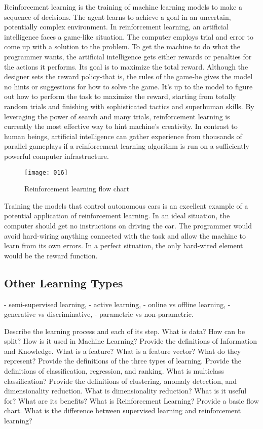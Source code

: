Reinforcement learning is the training of machine learning models to make a sequence of decisions. The agent learns to achieve a goal in an uncertain, potentially complex environment. In reinforcement learning, an artificial intelligence faces a game-like situation. The computer employs trial and error to come up with a solution to the problem. To get the machine to do what the programmer wants, the artificial intelligence gets either rewards or penalties for the actions it performs. Its goal is to maximize the total reward.
Although the designer sets the reward policy-that is, the rules of the game-he gives the model no hints or suggestions for how to solve the game. It's up to the model to figure out how to perform the task to maximize the reward, starting from totally random trials and finishing with sophisticated tactics and superhuman skills. By leveraging the power of search and many trials, reinforcement learning is currently the most effective way to hint machine's creativity. In contrast to human beings, artificial intelligence can gather experience from thousands of parallel gameplays if a reinforcement learning algorithm is run on a sufficiently powerful computer infrastructure.
\begin{figure}[t!]
    \begin{center}
        \texttt{[image: 016]}
    \end{center}
    \caption{Reinforcement learning flow chart}
    \label{fig:016}
\end{figure}

Training the models that control autonomous cars is an excellent example of a potential application of reinforcement learning. In an ideal situation, the computer should get no instructions on driving the car. The programmer would avoid hard-wiring anything connected with the task and allow the machine to learn from its own errors. In a perfect situation, the only hard-wired element would be the reward function.

\subsection{Other Learning Types}
- semi-supervised learning,
- active learning,
- online vs offline learning,
- generative vs discriminative,
- parametric vs non-parametric.

\newpage
\begin{exercise}[topsep=20pt,itemsep=10pt]
    \ex Describe the learning process and each of its step.
    \ex What is data? How can be split? How is it used in Machine Learning?
    \ex Provide the definitions of Information and Knowledge.
    \ex What is a feature? What is a feature vector? What do they represent? 
    \ex Provide the definitions of the three types of learning.
    \ex Provide the definitions of classification, regression, and ranking.
    \ex[!] What is multiclass classification?
    \ex Provide the definitions of clustering, anomaly detection, and dimensionality reduction.
    \ex[!] What is dimensionality reduction? What is it useful for? What are its benefits?
    \ex What is Reinforcement Learning? Provide a basic flow chart.
    \ex[!] What is the difference between supervised learning and reinforcement learning?
\end{exercise}